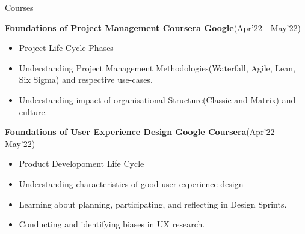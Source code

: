\begin{rSection}{Courses}
\begin{itemize}[leftmargin=*]
\end{itemize}

\vspace{-.2cm}
\item{\bf Foundations of Project Management Coursera Google}\hfill{(Apr'22 - May'22)}\\
[-0.4cm]

\begin{itemize}[leftmargin=*]

	\itemsep \sepval

	\item Project Life Cycle Phases

	\item Understanding Project Management Methodologies(Waterfall, Agile, Lean, Six Sigma) and respective use-cases.

	\item Understanding impact of organisational Structure(Classic and Matrix) and culture.

\end{itemize}

\vspace{-.2cm}
\item{\bf Foundations of User Experience Design Google Coursera}\hfill{(Apr'22 - May'22)}\\
[-0.4cm]

\begin{itemize}[leftmargin=*]

	\itemsep \sepval

	\item Product Developoment Life Cycle

	\item Understanding characteristics of good user experience design

	\item Learning about planning, participating, and reflecting in Design Sprints.

	\item Conducting and identifying biases in UX research.

\end{itemize}

\end{rSection}
